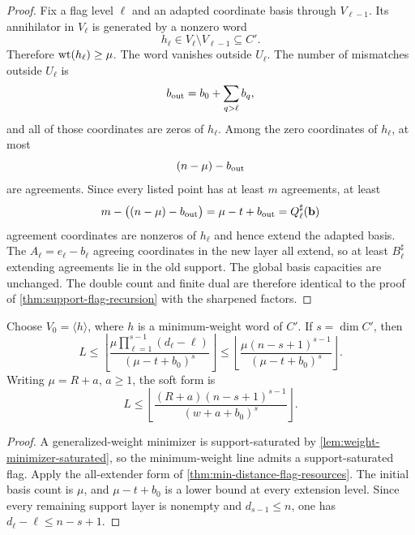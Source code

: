 \documentclass[11pt,a4paper]{amsart}
\numberwithin{equation}{section}
\theoremstyle{remark}
\begin{document}
\begin{proof}
Fix a flag level $\ell$ and an adapted coordinate basis through $V_{\ell-1}$.  Its annihilator in $V_\ell$ is generated by a nonzero word
\[
 h_\ell\in V_\ell\setminus V_{\ell-1}\subseteq C'.
\]
Therefore $\operatorname{wt}(h_\ell)\ge\mu$.  The word vanishes outside $U_\ell$.  The number of mismatches outside $U_\ell$ is
\[
 b_{\rm out}=b_0+\sum_{q>\ell}b_q,
\]
and all of those coordinates are zeros of $h_\ell$.  Among the zero coordinates of $h_\ell$, at most
\[
 (n-\mu)-b_{\rm out}
\]
are agreements.  Since every listed point has at least $m$ agreements, at least
\[
 m-\bigl((n-\mu)-b_{\rm out}\bigr)
 =\mu-t+b_{\rm out}
 =Q_\ell^{\sharp}(\mathbf b)
\]
agreement coordinates are nonzeros of $h_\ell$ and hence extend the adapted basis.  The $A_\ell=e_\ell-b_\ell$ agreeing coordinates in the new layer all extend, so at least $B_\ell^{\sharp}$ extending agreements lie in the old support.  The global basis capacities are unchanged.  The double count and finite dual are therefore identical to the proof of \cref{thm:support-flag-recursion} with the sharpened factors.
\end{proof}

\begin{corollary}
\label{cor:min-word-all-extender}
Choose $V_0=\langle h\rangle$, where $h$ is a minimum-weight word of $C'$.  If $s=\dim C'$, then
\begin{equation}
 \boxed{
 L\le
 \left\lfloor
 \frac{\mu\prod_{\ell=1}^{s-1}(d_\ell-\ell)}
      {(\mu-t+b_0)^s}
 \right\rfloor
 \le
 \left\lfloor
 \frac{\mu(n-s+1)^{s-1}}
      {(\mu-t+b_0)^s}
 \right\rfloor .
 }
 \label{eq:min-word-bound}
\end{equation}
Writing $\mu=R+a$, $a\ge1$, the soft form is
\begin{equation}
 L\le
 \left\lfloor
 \frac{(R+a)(n-s+1)^{s-1}}
      {(w+a+b_0)^s}
 \right\rfloor .
 \label{eq:min-word-soft}
\end{equation}
\end{corollary}

\begin{proof}
A generalized-weight minimizer is support-saturated by \cref{lem:weight-minimizer-saturated}, so the minimum-weight line admits a support-saturated flag.  Apply the all-extender form of \cref{thm:min-distance-flag-resources}.  The initial basis count is $\mu$, and $\mu-t+b_0$ is a lower bound at every extension level.  Since every remaining support layer is nonempty and $d_{s-1}\le n$, one has $d_\ell-\ell\le n-s+1$.
\end{proof}
\end{document}
